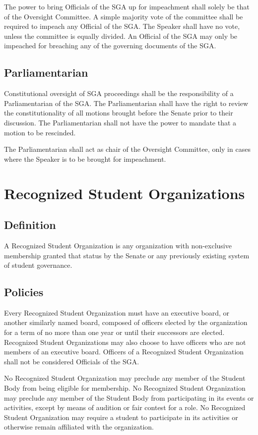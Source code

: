 \documentclass[12pt,oneside]{scrreprt}
\begin{document}
The power to bring Officials of the SGA up for impeachment shall solely be that of the
Oversight Committee. A simple majority vote of the committee shall be required to impeach any Official of the SGA. The Speaker shall have no vote, unless the committee is equally divided. An Official of the SGA may only be impeached for breaching any of the governing documents of the SGA.

\section{Parliamentarian}
Constitutional oversight of SGA proceedings shall be the responsibility of a Parliamentarian of the SGA. The Parliamentarian shall have the right to review the constitutionality of all motions brought before the Senate prior to their discussion. The Parliamentarian shall not have the power to mandate that a motion to be rescinded.

The Parliamentarian shall act as chair of the Oversight Committee, only in cases where
the Speaker is to be brought for impeachment.

\chapter{Recognized Student Organizations}

\section{Definition}
A Recognized Student Organization is any organization with non-exclusive membership granted that status by the Senate or any previously existing system of student governance.

\section{Policies}
Every Recognized Student Organization must have an executive board, or another similarly
named board, composed of officers elected by the organization for a term of no more than one year or until their successors are elected. Recognized Student Organizations may also choose to have officers who are not members of an executive board. Officers of a Recognized Student Organization shall not be considered Officials of the SGA.

No Recognized Student Organization may preclude any member of the Student Body from being eligible for membership. No Recognized Student Organization may preclude any member of the Student Body from participating in its events or activities, except by means of audition or fair contest for a role. No Recognized Student Organization may require a student to participate in its activities or otherwise remain affiliated with the organization.
\end{document}
